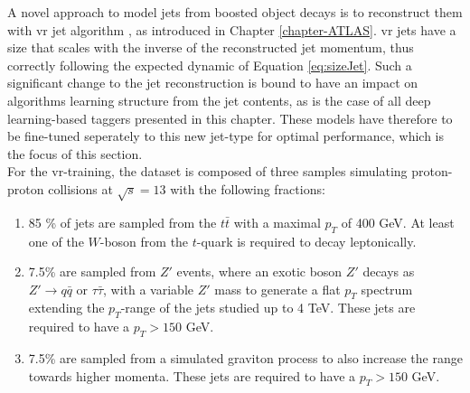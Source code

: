 A novel approach to model jets from boosted object decays is to reconstruct them with \gls{vr} jet algorithm \cite{vrJetPaper}, as introduced in Chapter \ref{chapter-ATLAS}. \gls{vr} jets have a size that scales with the inverse of the reconstructed jet momentum, thus correctly following the expected dynamic of Equation \ref{eq:sizeJet}. Such a significant change to the jet reconstruction is bound to have an impact on algorithms learning structure from the jet contents, as is the case of all deep learning-based taggers presented in this chapter. These models have therefore to be fine-tuned seperately to this new jet-type for optimal performance, which is the focus of this section. \\  %

For the \gls{vr}-training, the dataset is composed of three samples simulating proton-proton collisions at $\sqrt{s} = 13$ with the following fractions:
\begin{enumerate}
  \item 85 \% of jets are sampled from the $t\bar{t}$ with a maximal $p_T$ of 400 GeV. At least one of the $W$-boson from the $t$-quark is required to decay leptonically.
  \item 7.5\% are sampled from $Z'$ events, where an exotic boson $Z'$ decays as $Z' \rightarrow q\bar{q} \textrm{ or } \tau \bar{\tau}$, with a variable $Z'$ mass to generate a flat $p_T$ spectrum extending the $p_T$-range of the jets studied up to 4 TeV. These jets are required to have a $p_T > 150$ GeV.
  \item 7.5\% are sampled from a simulated graviton process to also increase the range towards higher momenta. These jets are required to have a $p_T > 150$ GeV.
\end{enumerate}

